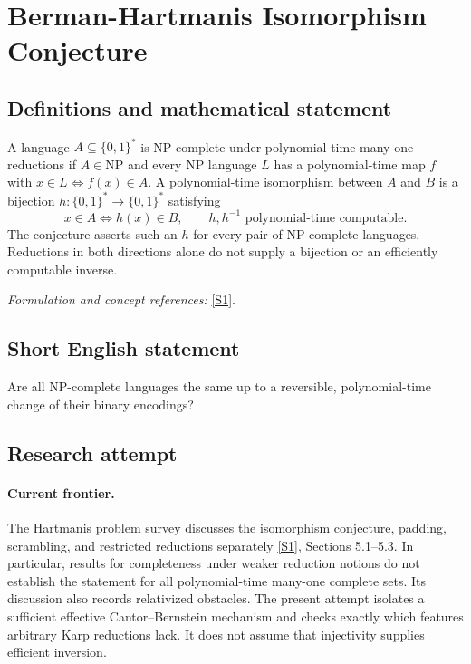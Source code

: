 \documentclass[11pt,a4paper]{article}
\newcommand{\sref}[2]{\hyperlink{source:#1:#2}{[S#2]}}
\newif\ifshowcatalogue
\newcommand{\cataloguescope}[1]{\ifshowcatalogue
 \paragraph{Exact scope in the supplied catalogue.}
 \begin{quote}\small #1\end{quote}\fi}
\numberwithin{equation}{section}
\begin{document}
\setcounter{section}{174}
\clearpage
\section{\texorpdfstring{Berman-Hartmanis Isomorphism Conjecture}{Berman-Hartmanis Isomorphism Conjecture}}\label{175}
\subsection{Definitions and mathematical statement}
A language $A\subseteq\{0,1\}^*$ is NP-complete under polynomial-time many-one reductions if $A\in\mathrm{NP}$ and every NP language $L$ has a polynomial-time map $f$ with $x\in L\iff f(x)\in A$. A polynomial-time isomorphism between $A$ and $B$ is a bijection $h:\{0,1\}^*\to\{0,1\}^*$ satisfying
\[
 x\in A\iff h(x)\in B,
 \qquad h,h^{-1}\text{ polynomial-time computable}.
\]
The conjecture asserts such an $h$ for every pair of NP-complete languages. Reductions in both directions alone do not supply a bijection or an efficiently computable inverse.
\par\smallskip\textit{Formulation and concept references:} \sref{175}{1}.
\cataloguescope{Prove or disprove that for every two languages A and B complete for NP under polynomial-time many-one reductions, there is a bijection h on binary strings such that h(A)=B and both h and its inverse are computable in polynomial time.}
\subsection{Short English statement}
Are all NP-complete languages the same up to a reversible, polynomial-time change of their binary encodings?
\subsection{Research attempt}

\paragraph{Current frontier.}
The Hartmanis problem survey discusses the isomorphism conjecture, padding,
scrambling, and restricted reductions separately \sref{175}{1},
Sections 5.1--5.3. In particular, results for completeness under weaker
reduction notions do not establish the statement for all polynomial-time
many-one complete sets. Its discussion also records relativized obstacles.
The present attempt isolates a sufficient effective Cantor--Bernstein
mechanism and checks exactly which features arbitrary Karp reductions
lack. It does not assume that injectivity supplies efficient inversion.
\end{document}
